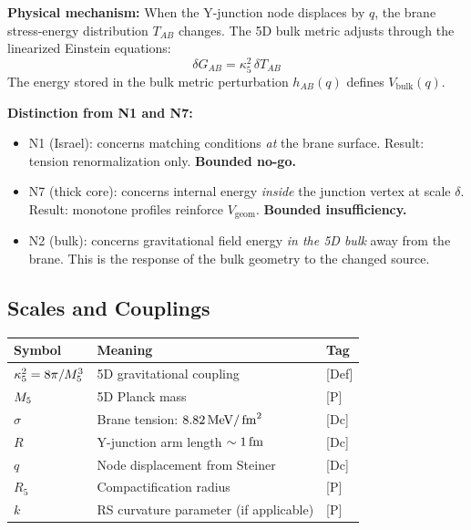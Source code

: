 \textbf{Physical mechanism:} When the Y-junction node displaces by $q$,
the brane stress-energy distribution $T_{AB}$ changes. The 5D bulk
metric adjusts through the linearized Einstein equations:
\begin{equation}
    \delta G_{AB} = \kappa_5^2\, \delta T_{AB}
    \label{eq:N2_linearized}
\end{equation}
The energy stored in the bulk metric perturbation $h_{AB}(q)$ defines
$V_{\mathrm{bulk}}(q)$.

\textbf{Distinction from N1 and N7:}
\begin{itemize}
    \item N1 (Israel): concerns matching conditions \emph{at} the brane
          surface. Result: tension renormalization only. \textbf{Bounded no-go.}
    \item N7 (thick core): concerns internal energy \emph{inside} the
          junction vertex at scale $\delta$. Result: monotone profiles
          reinforce $V_{\mathrm{geom}}$. \textbf{Bounded insufficiency.}
    \item N2 (bulk): concerns gravitational field energy \emph{in the
          5D bulk} away from the brane. This is the response of the
          bulk geometry to the changed source.
\end{itemize}

\subsection{Scales and Couplings}

\begin{center}
\begin{tabular}{lll}
\toprule
\textbf{Symbol} & \textbf{Meaning} & \textbf{Tag} \\
\midrule
$\kappa_5^2 = 8\pi/M_5^3$ & 5D gravitational coupling & [Def] \\
$M_5$ & 5D Planck mass & [P] \\
$\sigma$ & Brane tension: $8.82\,\mathrm{MeV}/\,\mathrm{fm}^2$ & [Dc] \\
$R$ & Y-junction arm length $\sim 1\,\mathrm{fm}$ & [Dc] \\
$q$ & Node displacement from Steiner & [Dc] \\
$R_5$ & Compactification radius & [P] \\
$k$ & RS curvature parameter (if applicable) & [P] \\
\bottomrule
\end{tabular}
\end{center}

